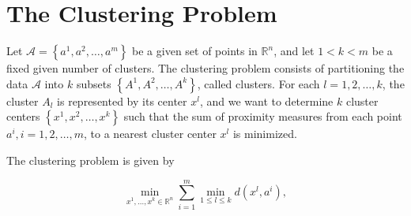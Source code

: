\documentclass[11pt]{article}
\numberwithin{equation}{section}
\begin{document}
%
%
%
%
%
%
%
%
%
%
%
%
%
%
%
%
%
%
%
%
%

\newpage

\section{The Clustering Problem}

Let $\mathcal{A}= \left\lbrace a^1, a^2, \ldots ,a^m \right\rbrace$ be a given set of points in $\mathbb{R}^n$, and let $1 < k < m$ be a fixed given number of clusters. The clustering problem consists of partitioning the data $\mathcal{A}$ into $k$ subsets $\left\lbrace A^1, A^2, \ldots ,A^k \right\rbrace$, called clusters. For each $l=1, 2, \ldots ,k$, the cluster $A_l$ is represented by its center $x^l$, and we want to determine $k$ cluster centers $\left\lbrace x^1, x^2, \ldots ,x^k \right\rbrace$ such that the sum of proximity measures from each point $a^i, i=1, 2, \ldots ,m$, to a nearest cluster center $x^l$ is minimized.

The clustering problem is given by

\begin{equation}
	\min\limits_{x^1, \ldots ,x^k \in \mathbb{R}^n} \sum\limits_{i=1}^{m} \min\limits_{1 \le l \le k} d(x^l,a^i) , \label{StateEq1}
\end{equation}
\end{document}
